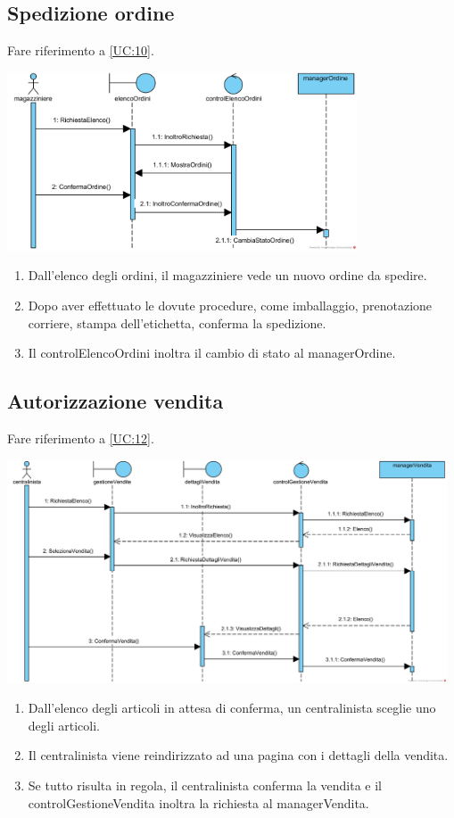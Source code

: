 \documentclass[12pt,a4paper]{article}
\begin{document}
\subsection{Spedizione ordine}

Fare riferimento a \ref{UC:10}.

\includegraphics[height=200px]{SequenceDiagram/SpedizioneOrdine}

\begin{enumerate}
\item Dall'elenco degli ordini, il magazziniere vede un nuovo ordine da spedire.
\item Dopo aver effettuato le dovute procedure, come imballaggio, prenotazione corriere, stampa dell'etichetta, conferma la spedizione.
\item Il controlElencoOrdini inoltra il cambio di stato al managerOrdine.
\end{enumerate}

\subsection{Autorizzazione vendita}

Fare riferimento a \ref{UC:12}.

\includegraphics[height=250px]{SequenceDiagram/AutorizzazioneVendita}

\begin{enumerate}
\item Dall'elenco degli articoli in attesa di conferma, un centralinista sceglie uno degli articoli.
\item Il centralinista viene reindirizzato ad una pagina con i dettagli della vendita.
\item Se tutto risulta in regola, il centralinista conferma la vendita e il controlGestioneVendita inoltra la richiesta al managerVendita.
\end{enumerate}
\end{document}

